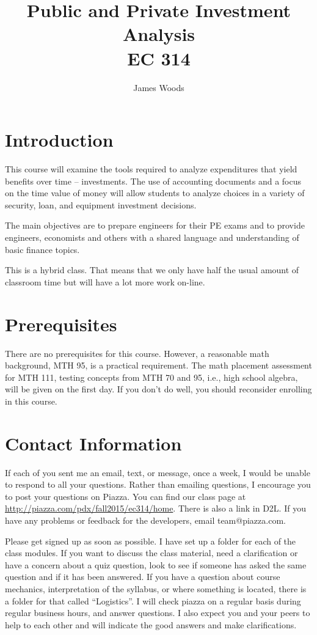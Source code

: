 \documentclass[letterpaper,10pt]{article}
\date{}
\title{Public and Private Investment Analysis\\  
EC 314\\
\Term}
\author{James Woods}
\newcommand{\Piazza}{\url{ http://piazza.com/pdx/fall2015/ec314/home}}
\begin{document}
  
\maketitle

\section{Introduction}

This course will examine the tools required to analyze expenditures
that yield benefits over time -- investments. The use of accounting
documents and a focus on the time value of money will allow students
to analyze choices in a variety of security, loan, and equipment
investment decisions.

The main objectives are to prepare engineers for their PE exams and to
provide engineers, economists and others with a shared language and
understanding of basic finance topics.

This is a hybrid class. That means that we only have half the usual amount of classroom time but will have a lot more work on-line.


\section{Prerequisites}

There are no prerequisites for this course. However, a reasonable math
background, MTH 95, is a practical requirement. 
 The math placement assessment for MTH 111, testing concepts from MTH 70 and 95, i.e., high school algebra, will be given on the first day.  If you don't do well, you should reconsider enrolling in this course.

\section{Contact Information}

If each of you sent me an email, text, or message, once a week, I would be unable to respond to all your questions.  Rather than emailing questions, I encourage you to post your questions on Piazza. You can find our class page at \Piazza.  There is also a link in D2L. If you have any problems or feedback for the developers, email team@piazza.com.

Please get signed up as soon as possible. I have set up a
folder for each of the class modules. If you want to discuss the class material, need a clarification or have a concern about a quiz question, look to see if someone has asked the same question and if it has been answered. 
If you have a question about course mechanics, interpretation of the
syllabus, or where something is located, there is a folder for
that called ``Logistics''. I will check piazza on a regular basis during regular business hours, and answer questions. I also expect you and your peers to help to each other and will indicate the good answers and make clarifications.  
\end{document}
